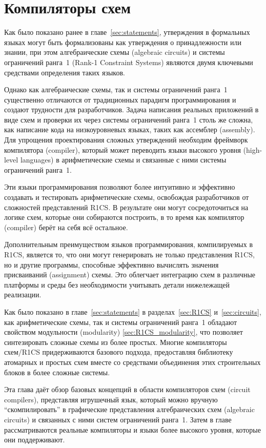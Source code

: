 \chapter{Компиляторы схем}\label{chap:circuit-compilers}
Как было показано ранее в главе~\ref{sec:statements}, утверждения в формальных языках могут быть формализованы как утверждения о принадлежности или знании, при этом алгебраические схемы (algebraic circuits) и системы ограничений ранга~1 (Rank-1 Constraint Systems) являются двумя ключевыми средствами определения таких языков.

Однако как алгебраические схемы, так и системы ограничений ранга~1 существенно отличаются от традиционных парадигм программирования и создают трудности для разработчиков. Задача написания реальных приложений в виде схем и проверки их через системы ограничений ранга~1 столь же сложна, как написание кода на низкоуровневых языках, таких как ассемблер (assembly). Для упрощения проектирования сложных утверждений необходим фреймворк компилятора (compiler), который может переводить языки высокого уровня (high-level languages) в арифметические схемы и связанные с ними системы ограничений ранга~1.

Эти языки программирования позволяют более интуитивно и эффективно создавать и тестировать арифметические схемы, освобождая разработчиков от сложностей представлений R1CS. В результате они могут сосредоточиться на логике схем, которые они собираются построить, в то время как компилятор (compiler) берёт на себя всё остальное.

Дополнительным преимуществом языков программирования, компилируемых в R1CS, является то, что они могут генерировать не только представления R1CS, но и другие программы, способные эффективно вычислять значения присваиваний (assignment) схемы. Это облегчает интеграцию схем в различные платформы и среды без необходимости учитывать детали нижележащей реализации.

Как было показано в главе~\ref{sec:statements} в разделах~\ref{sec:R1CS} и~\ref{sec:circuits}, как арифметические схемы, так и системы ограничений ранга~1 обладают свойством модульности (modularity) \ref{sec:R1CS_modularity}, что позволяет синтезировать сложные схемы из более простых. Многие компиляторы схем/R1CS придерживаются базового подхода, предоставляя библиотеку атомарных и простых схем вместе со средствами объединения этих строительных блоков в более сложные системы.

Эта глава даёт обзор базовых концепций в области компиляторов схем (circuit compilers), представляя игрушечный язык, который можно вручную ``скомпилировать'' в графические представления алгебраических схем (algebraic circuits) и связанных с ними систем ограничений ранга~1. Затем в главе рассматриваются реальные компиляторы и языки более высокого уровня, которые они поддерживают.

